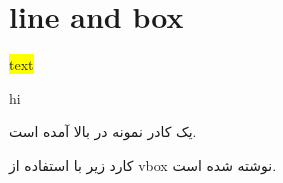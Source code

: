 \documentclass[12pt]{article}
\begin{document}
\section{line and box}
\hlineshort



\colorbox{yellow}{text}

{\color{red}
}

hi


یک کادر نمونه در بالا آمده است.

کارد زیر با استفاده از vbox نوشته شده است.

\textbox[green]{\vbox{\noindent\ptext[1]}}


\hlinelong
\theend
\end{document}
